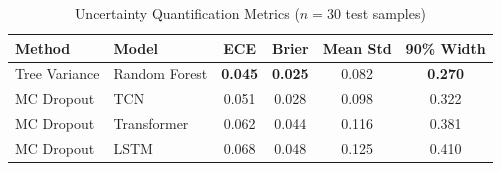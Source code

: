 \documentclass{ieeeaccess}
\begin{document}
\begin{table}[h]
\centering
\caption{Uncertainty Quantification Metrics ($n=30$ test samples)}
\label{tab:uncertainty_metrics}
\begin{tabular}{|l|l|c|c|c|c|}
\hline
\textbf{Method} & \textbf{Model} & \textbf{ECE} & \textbf{Brier} & \textbf{Mean Std} & \textbf{90\% Width} \\
\hline
Tree Variance    & Random Forest & \textbf{0.045} & \textbf{0.025} & 0.082 & \textbf{0.270} \\
MC Dropout       & TCN           & 0.051 & 0.028 & 0.098 & 0.322 \\
MC Dropout       & Transformer   & 0.062 & 0.044 & 0.116 & 0.381 \\
MC Dropout       & LSTM          & 0.068 & 0.048 & 0.125 & 0.410 \\
\hline
\end{tabular}
\end{table}
\end{document}
